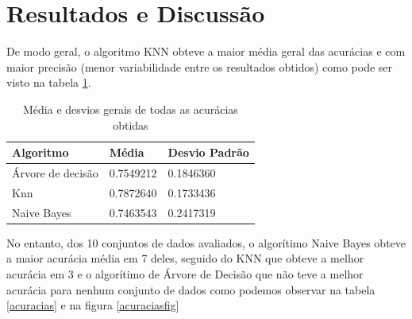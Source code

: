\documentclass[12pt, a4paper]{article}
\begin{document}
\section{Resultados e Discussão}

De modo geral, o algoritmo KNN obteve a maior média geral das acurácias e com maior precisão (menor variabilidade entre os resultados obtidos) como pode ser visto na tabela \ref{acuracias_geral}.


\begin{table}[!ht]
\centering
\caption{Média e desvios gerais de todas as acurácias obtidas}
\label{acuracias_geral}
\begin{tabular}{|l|l|l|}
\hline
Algoritmo & Média & Desvio Padrão\\
\hline
Árvore de decisão & 0.7549212 &0.1846360\\
Knn & 0.7872640 &0.1733436 \\
Naive Bayes &
0.7463543 &0.2417319\\
\hline
\end{tabular}
\end{table}

No entanto, dos 10 conjuntos de dados avaliados, o algorítimo Naive Bayes obteve a maior acurácia média em 7 deles, seguido do KNN que obteve a melhor acurácia em 3 e o algorítimo de Árvore de Decisão que não teve a melhor acurácia para nenhum conjunto de dados como podemos observar na tabela \ref{acuracias} e na figura \ref{acuraciasfig}
\end{document}
